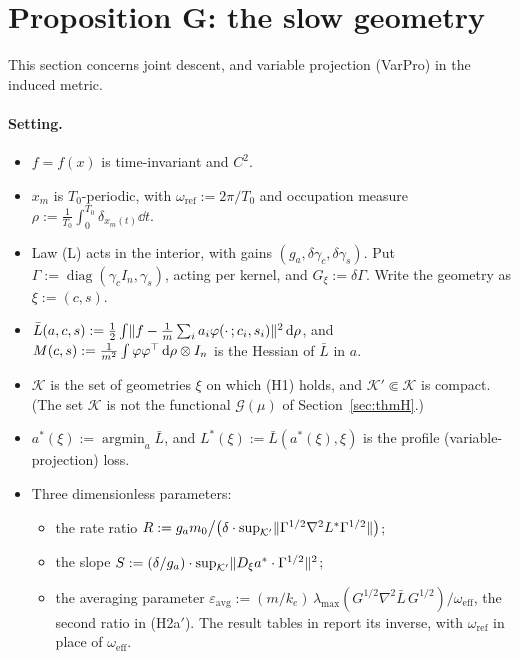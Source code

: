 \section{Proposition G: the slow geometry}\label{sec:propG}

This section concerns joint descent, and variable projection (VarPro) in the induced metric.

\paragraph{Setting.}
\begin{itemize}
  \item $f = f(x)$ is time-invariant and $C^2$.
  \item $x_m$ is $T_0$-periodic, with $\omega_{\mathrm{ref}} := 2\pi/T_0$ and occupation measure
    $\rho := \frac{1}{T_0}\int_0^{T_0}\delta_{x_m(t)}\dd t$.
  \item Law (L) acts in the interior, with gains $(g_a, \delta\gamma_c, \delta\gamma_s)$. Put
    $\Gamma := \operatorname{diag}(\gamma_c I_n, \gamma_s)$, acting per kernel, and $G_\xi := \delta\Gamma$. Write the
    geometry as $\xi := (c, s)$.
  \item $\bar L(a,c,s) := \frac12\int\lVert f - \frac1m\sum_i a_i\varphi(\cdot\,;c_i,s_i)\rVert^2\,\mathrm{d}\rho$, and
    $M(c,s) := \frac{1}{m^2}\int\varphi\varphi^\top\,\mathrm{d}\rho\otimes I_n$ is the Hessian of $\bar L$ in $a$.
  \item $\mathcal{K}$ is the set of geometries $\xi$ on which (H1) holds, and $\mathcal{K}'\Subset\mathcal{K}$ is
    compact. (The set $\mathcal{K}$ is not the functional $\mathcal{G}(\mu)$ of Section~\ref{sec:thmH}.)
  \item $a^*(\xi) := \operatorname{argmin}_a\bar L$, and $L^*(\xi) := \bar L(a^*(\xi),\xi)$ is the profile
    (variable-projection) loss.
  \item Three dimensionless parameters:
    \begin{itemize}
      \item the rate ratio
        $R := g_a m_0\big/\bigl(\delta\cdot\sup_{\mathcal{K}'}\lVert \Gamma^{1/2}\nabla^2L^*\Gamma^{1/2}\rVert\bigr)$;
      \item the slope $S := (\delta/g_a)\cdot\sup_{\mathcal{K}'}\lVert D_\xi a^*\cdot\Gamma^{1/2}\rVert^2$;
      \item the averaging parameter
        $\varepsilon_{\mathrm{avg}} := (m/k_e)\,\lambda_{\max}(G^{1/2}\nabla^2\bar L\,G^{1/2})/\omega_{\mathrm{eff}}$,
        the second ratio in (H2a$'$). The result tables in  report its inverse, with $\omega_{\mathrm{ref}}$ in place of
        $\omega_{\mathrm{eff}}$.
    \end{itemize}
\end{itemize}

